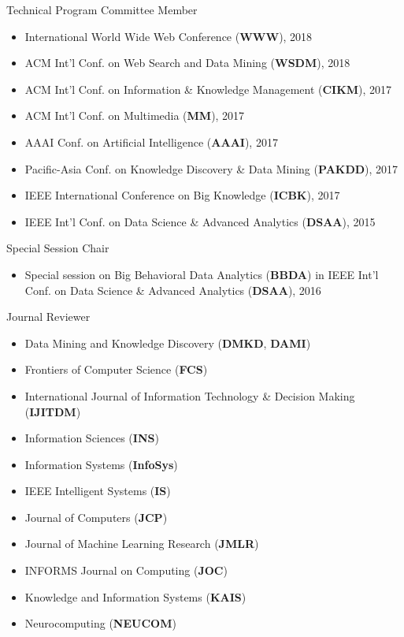 \documentclass[margin, 9pt]{res}
\begin{document}
\begin{resume}
{Technical Program Committee Member}
\begin{itemize}
\item International World Wide Web Conference (\textbf{WWW}), 2018
\item ACM Int'l Conf. on Web Search and Data Mining (\textbf{WSDM}), 2018
\item ACM Int'l Conf. on Information \& Knowledge Management (\textbf{CIKM}), 2017
\item ACM Int'l Conf. on Multimedia (\textbf{MM}), 2017
\item AAAI Conf. on Artificial Intelligence (\textbf{AAAI}), 2017
\item Pacific-Asia Conf. on Knowledge Discovery \& Data Mining (\textbf{PAKDD}), 2017
\item IEEE International Conference on Big Knowledge (\textbf{ICBK}), 2017
\item IEEE Int'l Conf. on Data Science \& Advanced Analytics (\textbf{DSAA}), 2015
\end{itemize}
\vspace{-0.1in}
{Special Session Chair}
\begin{itemize}
\item Special session on Big Behavioral Data Analytics (\textbf{BBDA})
	in IEEE Int'l Conf. on Data Science \& Advanced Analytics (\textbf{DSAA}), 2016
\end{itemize}
\vspace{-0.1in}
{Journal Reviewer}
\begin{itemize}
\item Data Mining and Knowledge Discovery (\textbf{DMKD}, \textbf{DAMI})
\item Frontiers of Computer Science (\textbf{FCS})
\item International Journal of Information Technology \& Decision Making (\textbf{IJITDM})
\item Information Sciences (\textbf{INS})
\item Information Systems (\textbf{InfoSys})
\item IEEE Intelligent Systems (\textbf{IS})
\item Journal of Computers (\textbf{JCP})
\item Journal of Machine Learning Research (\textbf{JMLR})
\item INFORMS Journal on Computing (\textbf{JOC})
\item Knowledge and Information Systems (\textbf{KAIS})
\item Neurocomputing (\textbf{NEUCOM})

\end{itemize}
\end{resume}
\end{document}
